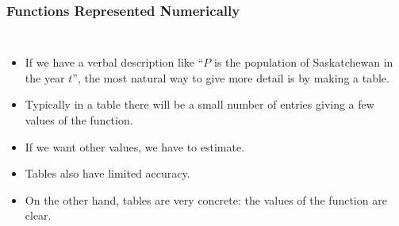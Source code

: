 \documentclass[serif,ignorenonframetext]{beamer}
\begin{document}
\begin{frame}
  \frametitle{Functions Represented Numerically}
  \begin{columns}
  \begin{itemize}[<+->]
  \item<1-> If we have a verbal description like ``$P$ is the population
    of Saskatchewan in the year $t$'', the most natural way to give more
    detail is by making a table.
  \item<3-> Typically in a table there will be a small number of
    entries giving a few values of the function.
  \item<4-> If we want other values, we have to estimate.
  \item<5-> Tables also have limited accuracy.
  \item<6-> On the other hand, tables are very concrete: the values of
    the function are clear.
  \end{itemize}
  \end{columns}
\end{frame}
\end{document}
